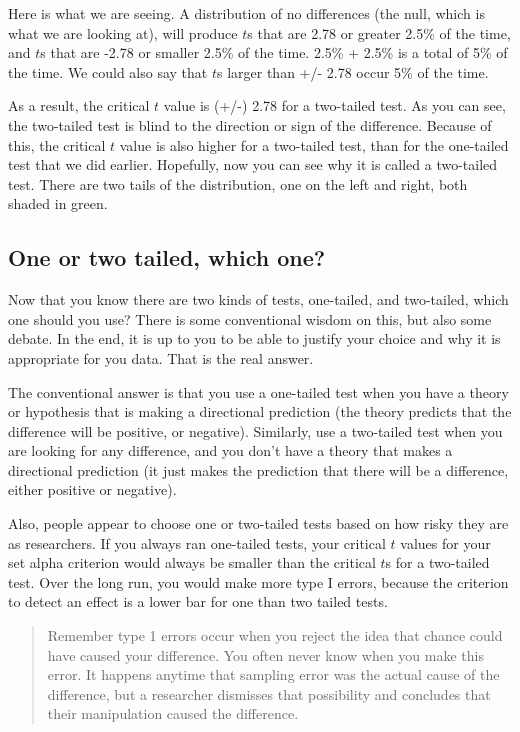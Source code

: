 \documentclass[
]{book}
\begin{document}
Here is what we are seeing. A distribution of no differences (the null, which is what we are looking at), will produce \(t\)s that are 2.78 or greater 2.5\% of the time, and \(t\)s that are -2.78 or smaller 2.5\% of the time. 2.5\% + 2.5\% is a total of 5\% of the time. We could also say that \(t\)s larger than +/- 2.78 occur 5\% of the time.

As a result, the critical \(t\) value is (+/-) 2.78 for a two-tailed test. As you can see, the two-tailed test is blind to the direction or sign of the difference. Because of this, the critical \(t\) value is also higher for a two-tailed test, than for the one-tailed test that we did earlier. Hopefully, now you can see why it is called a two-tailed test. There are two tails of the distribution, one on the left and right, both shaded in green.

\subsection{One or two tailed, which one?}\label{one-or-two-tailed-which-one}

Now that you know there are two kinds of tests, one-tailed, and two-tailed, which one should you use? There is some conventional wisdom on this, but also some debate. In the end, it is up to you to be able to justify your choice and why it is appropriate for you data. That is the real answer.

The conventional answer is that you use a one-tailed test when you have a theory or hypothesis that is making a directional prediction (the theory predicts that the difference will be positive, or negative). Similarly, use a two-tailed test when you are looking for any difference, and you don't have a theory that makes a directional prediction (it just makes the prediction that there will be a difference, either positive or negative).

Also, people appear to choose one or two-tailed tests based on how risky they are as researchers. If you always ran one-tailed tests, your critical \(t\) values for your set alpha criterion would always be smaller than the critical \(t\)s for a two-tailed test. Over the long run, you would make more type I errors, because the criterion to detect an effect is a lower bar for one than two tailed tests.

\begin{quote}
Remember type 1 errors occur when you reject the idea that chance could have caused your difference. You often never know when you make this error. It happens anytime that sampling error was the actual cause of the difference, but a researcher dismisses that possibility and concludes that their manipulation caused the difference.
\end{quote}
\end{document}
